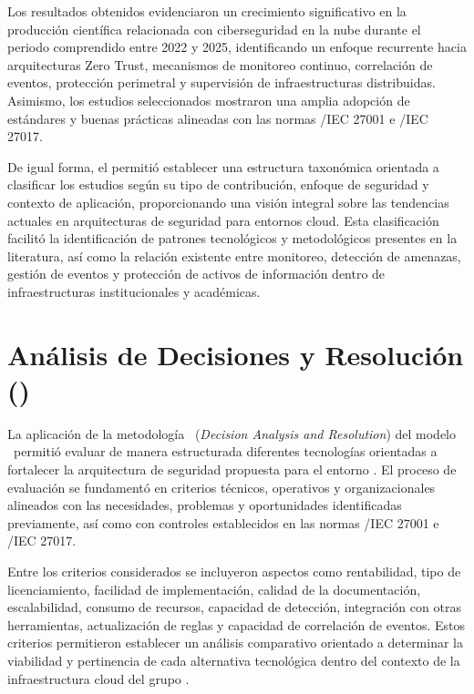 Los resultados obtenidos evidenciaron un crecimiento significativo en la producción científica relacionada con ciberseguridad en la nube 
durante el periodo comprendido entre 2022 y 2025, identificando un enfoque recurrente hacia arquitecturas Zero Trust, mecanismos de 
monitoreo continuo, correlación de eventos, protección perimetral y supervisión de infraestructuras distribuidas. Asimismo, los estudios 
seleccionados mostraron una amplia adopción de estándares y buenas prácticas alineadas con las normas \ISO/IEC 27001 e \ISO/IEC 27017.

De igual forma, el \SMS permitió establecer una estructura taxonómica orientada a clasificar los estudios según su tipo de contribución, 
enfoque de seguridad y contexto de aplicación, proporcionando una visión integral sobre las tendencias actuales en arquitecturas de 
seguridad para entornos cloud. Esta clasificación facilitó la identificación de patrones tecnológicos y metodológicos presentes en la 
literatura, así como la relación existente entre monitoreo, detección de amenazas, gestión de eventos y protección de activos de 
información dentro de infraestructuras institucionales y académicas.

\section{Análisis de Decisiones y Resolución (\DAR)}
\noindent

La aplicación de la metodología \DAR\ (\textit{Decision Analysis and Resolution}) del modelo \CMMI\ permitió evaluar de manera estructurada 
diferentes tecnologías orientadas a fortalecer la arquitectura de seguridad propuesta para el entorno \GRID. El proceso de evaluación se 
fundamentó en criterios técnicos, operativos y organizacionales alineados con las necesidades, problemas y oportunidades identificadas 
previamente, así como con controles establecidos en las normas \ISO/IEC 27001 e \ISO/IEC 27017.

Entre los criterios considerados se incluyeron aspectos como rentabilidad, tipo de licenciamiento, facilidad de implementación, calidad de 
la documentación, escalabilidad, consumo de recursos, capacidad de detección, integración con otras herramientas, actualización de reglas y 
capacidad de correlación de eventos. Estos criterios permitieron establecer un análisis comparativo orientado a determinar la viabilidad y 
pertinencia de cada alternativa tecnológica dentro del contexto de la infraestructura cloud del grupo \GRID.

